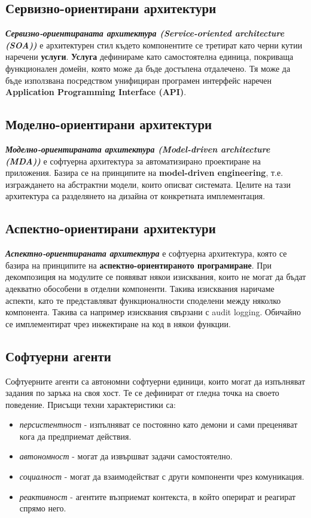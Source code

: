 \documentclass[fleqn,12pt]{article}
\begin{document}
\subsection{Сервизно-ориентирани архитектури}

\textbf{\textit{Сервизно-ориентираната архитектура (Service-oriented architecture (SOA))}} е архитектурен стил където компонентите се третират като черни кутии наречени \textbf{услуги}.
\textbf{Услуга} дефинираме като самостоятелна единица, покриваща функционален домейн, която може да бъде достъпена отдалечено.
Тя може да бъде използвана посредством унифициран програмен интерфейс наречен \textbf{Application Programming Interface (API)}.

\subsection{Моделно-ориентирани архитектури}

\textbf{\textit{Моделно-ориентираната архитектура (Model-driven architecture (MDA))}} е софтуерна архитектура за автоматизирано проектиране на приложения.
Базира се на принципите на \textbf{model-driven engineering}, т.е. изграждането на абстрактни модели, които описват системата.
Целите на тази архитектура са разделянето на дизайна от конкретната имплементация.

\subsection{Аспектно-ориентирани архитектури}

\textbf{\textit{Аспектно-ориентираната архитектура}} е софтуерна архитектура, която се базира на принципите на \textbf{аспектно-ориентираното програмиране}.
При декомпозиция на модулите се появяват някои изисквания, които не могат да бъдат адекватно обособени в отделни компоненти.
Такива изисквания наричаме аспекти, като те представляват функционалности споделени между няколко компонента.
Такива са например изисквания свързани с audit logging.
Обичайно се имплементират чрез инжектиране на код в някои функции.

\subsection{Софтуерни агенти}

Софтуерните агенти са автономни софтуерни единици, които могат да изпълняват задания по заръка на своя хост.
Те се дефинират от гледна точка на своето поведение.
Присъщи техни характеристики са:
\begin{itemize}
    \item \textit{персистентност} - изпълняват се постоянно като демони и сами преценяват кога да предприемат действия.
    \item \textit{автономност} - могат да извършват задачи самостоятелно.
    \item \textit{социалност} - могат да взаимодействат с други компоненти чрез комуникация.
    \item \textit{реактивност} - агентите възприемат контекста, в който оперират и реагират спрямо него.
\end{itemize}
\end{document}
